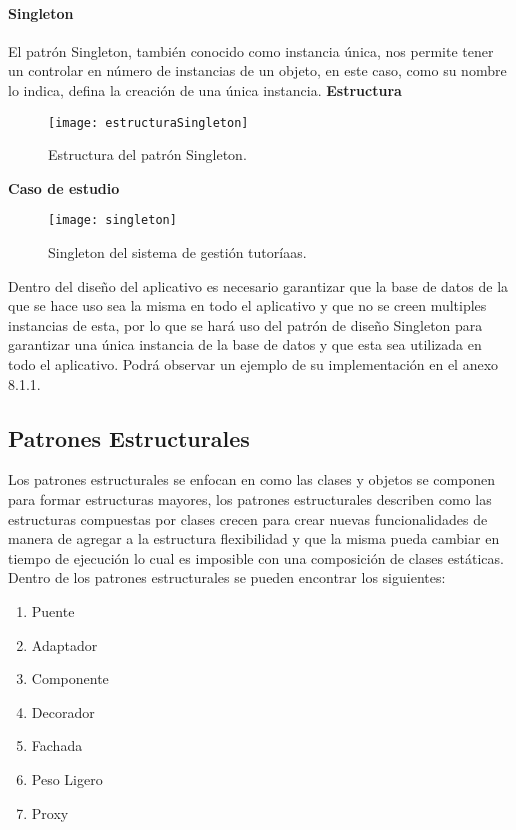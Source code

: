 \paragraph{Singleton}
El patrón Singleton, también conocido como instancia única, nos permite tener un controlar en número de instancias de un objeto, en este caso, como su nombre lo indica, defina la creación de una única instancia.
\newline
\indent\textbf{Estructura}
\newline
\begin{figure}[H]
	\centering
	\texttt{[image: estructuraSingleton]}
    \centering
    \caption{Estructura del patrón Singleton.}
	\label{fig:eSingleton}
\end{figure}
\indent\textbf{Caso de estudio}
\newline
\begin{figure}[H]
	\centering
	\texttt{[image: singleton]}
    \centering
    \caption{Singleton del sistema de gestión tutoríaas.}
	\label{fig:singleton}
\end{figure}

\indent Dentro del diseño del aplicativo es necesario garantizar que la base de datos de la que se hace uso sea la misma en todo el aplicativo y que no se creen multiples instancias de esta, por lo que se hará uso del patrón de diseño Singleton para garantizar una única instancia de la base de datos y que esta sea utilizada en todo el aplicativo. Podrá observar un ejemplo de su implementación en el anexo 8.1.1.
\newpage
\subsection{Patrones Estructurales}
Los patrones estructurales se enfocan en como las clases y objetos se componen para formar
estructuras mayores, los patrones estructurales describen como las estructuras compuestas por clases
crecen para crear nuevas funcionalidades de manera de agregar a la estructura flexibilidad y que la
misma pueda cambiar en tiempo de ejecución lo cual es imposible con una composición de clases
estáticas\cite{estruct}.
Dentro de los patrones estructurales se pueden encontrar los siguientes:
\begin{enumerate}
\item Puente
\item Adaptador
\item Componente
\item Decorador
\item Fachada
\item Peso Ligero
\item Proxy
\end{enumerate}

